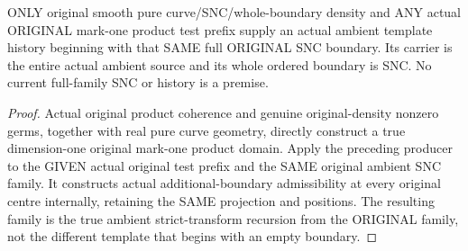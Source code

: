 \begin{theorem}
\label{hir:sharp-original-curve-test-history-full-original-ambient-boundary}
\leanok
ONLY original smooth pure curve/SNC/whole-boundary density and ANY actual
ORIGINAL mark-one product test prefix supply an actual ambient template
history beginning with that SAME full ORIGINAL SNC boundary. Its carrier
is the entire actual ambient source and its whole ordered boundary is
SNC. No current full-family SNC or history is a premise.
\end{theorem}
\begin{proof}
Actual original product coherence and genuine original-density nonzero
germs, together with real pure curve geometry, directly construct a true
dimension-one original mark-one product domain. Apply the preceding
producer to the GIVEN actual original test prefix and the SAME original
ambient SNC family. It constructs actual additional-boundary admissibility
at every original centre internally, retaining the SAME projection and
positions. The resulting family is the true ambient strict-transform
recursion from the ORIGINAL family, not the different template that
begins with an empty boundary.
\end{proof}

